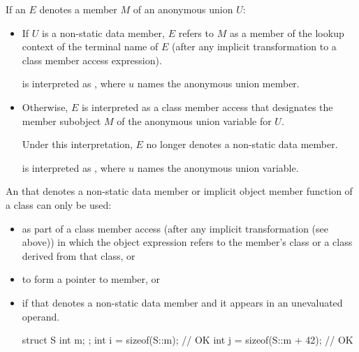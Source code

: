 \pnum
If an  $E$ denotes
a member $M$ of an anonymous union $U$:
\begin{itemize}
\item
If $U$ is a non-static data member,
$E$ refers to $M$ as a member of the lookup context of the terminal name of $E$
(after any implicit transformation to
a class member access expression).
\begin{example}
 is interpreted as ,
where $u$ names the anonymous union member.
\end{example}
\item
Otherwise, $E$ is interpreted as a class member access
that designates the member subobject $M$ of
the anonymous union variable for $U$.
\begin{note}
Under this interpretation, $E$ no longer denotes a non-static data member.
\end{note}
\begin{example}
 is interpreted as ,
where $u$ names the anonymous union variable.
\end{example}
\end{itemize}

\pnum
An  that denotes a non-static data member or
implicit object member function of a class can only be used:
\begin{itemize}
\item as part of a class member access
(after any implicit transformation (see above))
in which the
object expression
refers to the member's class
or a class derived from
that class, or

\item to form a pointer to member, or

\item if that  denotes a non-static data member
and it appears in an unevaluated operand.
\begin{example}
\begin{codeblock}
struct S {
  int m;
};
int i = sizeof(S::m);           // OK
int j = sizeof(S::m + 42);      // OK
\end{codeblock}
\end{example}
\end{itemize}

